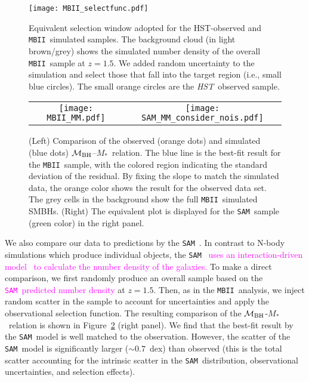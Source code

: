 \documentclass[twocolumn,trackchanges]{aastex63}
\newcommand{\hst}{{\it HST}}
\newcommand{\mbh}{$\mathcal M_{\rm BH}$}
\newcommand{\mstar}{{$M_*$}}
\newcommand{\sam}{\texttt{SAM}}
\newcommand{\mbii}{\texttt{MBII}}
\newcommand{\pink}[1]{{ \textcolor{magenta}{#1}}}
\begin{document}
\begin{figure}[t]
\texttt{[image: MBII\_selectfunc.pdf]}
\caption{Equivalent selection window adopted for the HST-observed and  \mbii\ simulated samples. The background cloud (in light brown/grey) shows the simulated number density of the overall \mbii\ sample at $z=1.5$. We added random uncertainty to the simulation and select those that fall into the target region (i.e., small blue circles). The small orange circles are the \hst\ observed sample.}
\label{fig:selectfunc}
\end{figure}

\begin{figure*}[t]%
\begin{tabular}{c c}
\texttt{[image: MBII\_MM.pdf]} &
\texttt{[image: SAM\_MM\_consider\_nois.pdf]} \\
\end{tabular}
\caption{(Left) Comparison of the observed (orange dots) and simulated (blue dots) \mbh--\mstar\ relation. The blue line is the best-fit result for the \mbii\ sample, with the colored region indicating the standard deviation of the residual. By fixing the slope to match the simulated data, the orange color shows the result for the observed data set. The grey cells in the background show the full \mbii\ simulated SMBHs. (Right) The equivalent plot is displayed for the \sam\ sample (green color) in the right panel.}
\label{fig:MM_comp}
\end{figure*}

We also compare our data to predictions by the \sam\ . In contrast to N-body simulations which produce individual objects, the \sam\ \pink{uses an interaction-driven model~\citep{Menci2014} to calculate the number density of the galaxies.} To make a direct comparison, we first randomly produce an overall sample based on the \pink{\sam\ predicted number density} at $z=1.5$. Then, as in the \mbii\ analysis, we inject random scatter in the sample to account for uncertainties and apply the observational selection function. The resulting comparison of the  \mbh-\mstar\ relation is shown in Figure~\ref{fig:MM_comp} (right panel). We find that the best-fit result by the \sam\ model is well matched to the observation. However, the scatter of the \sam\ model is significantly larger ($\sim0.7$~dex) than observed (this is the total scatter accounting for the intrinsic scatter in the \sam\ distribution, observational uncertainties, and selection effects).  
\end{document}
